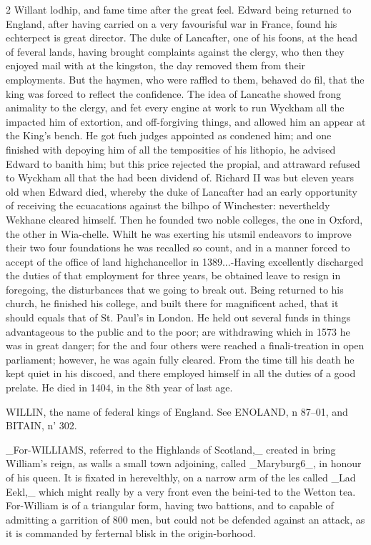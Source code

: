 \documentclass[10pt]{article}
\begin{document}
\begin{multicols}{2}\raggedcolumns
Willant lodhip, and fame time after the great feel. Edward being returned to England, after having carried on a very favourisful war in France, found his echterpect is great director. The duke of Lancafter, one of his foons, at the head of feveral lands, having brought complaints against the clergy, who then they enjoyed mail with at the kingston, the day removed them from their employments. But the haymen, who were raffled to them, behaved do fil, that the king was forced to reflect the confidence. The idea of Lancathe showed frong animality to the clergy, and fet every engine at work to run Wyckham all the impacted him of extortion, and off-forgiving things, and allowed him an appear at the King's bench. He got fuch judges appointed as condened him; and one finished with depoying him of all the temposities of his lithopio, he advised Edward to banith him; but this price rejected the propial, and attraward refused to Wyckham all that the had been dividend of. Richard II was but eleven years old when Edward died, whereby the duke of Lancafter had an early opportunity of receiving the ecuacations against the bilhpo of Winchester: nevertheldy Wekhane cleared himself. Then he founded two noble colleges, the one in Oxford, the other in Wia-chelle. Whilt he was exerting his utsmil endeavors to improve their two four foundations he was recalled so count, and in a manner forced to accept of the office of land highchancellor in 1389...-Having excellently discharged the duties of that employment for three years, be obtained leave to resign in foregoing, the disturbances that we going to break out. Being returned to his church, he finished his college, and built there for magnificent ached, that it should equals that of St. Paul’s in London. He held out several funds in things advantageous to the public and to the poor; are withdrawing which in 1573 he was in great danger; for the and four others were reached a finali-treation in open parliament; however, he was again fully cleared. From the time till his death he kept quiet in his discoed, and there employed himself in all the duties of a good prelate. He died in 1404, in the 8th year of last age.

WILLIN, the name of federal kings of England. See ENOLAND, n 87--01, and BITAIN, n' 302.

\_For-WILLIAMS, referred to the Highlands of Scotland,\_ created in bring William's reign, as walls a small town adjoining, called \_Maryburg6\_, in honour of his queen. It is fixated in herevelthly, on a narrow arm of the les called \_Lad Eekl,\_ which might really by a very front even the beini-ted to the Wetton tea. For-William is of a triangular form, having two battions, and to capable of admitting a garrition of 800 men, but could not be defended against an attack, as it is commanded by ferternal blisk in the origin-borhood.


\end{multicols}
\end{document}
